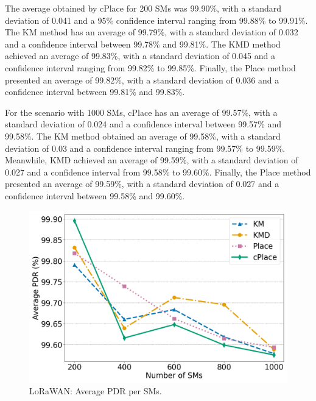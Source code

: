 \documentclass[a4paper,fleqn]{cas-dc}
\begin{document}
The average obtained by cPlace for 200 \gls{SMs} was 99.90\%, with a standard deviation of 0.041 and a 95\% confidence interval ranging from 99.88\% to 99.91\%. The KM method has an average of 99.79\%, with a standard deviation of 0.032 and a confidence interval between 99.78\% and 99.81\%. The KMD method achieved an average of 99.83\%, with a standard deviation of 0.045 and a confidence interval ranging from 99.82\% to 99.85\%. Finally, the Place method presented an average of 99.82\%, with a standard deviation of 0.036 and a confidence interval between 99.81\% and 99.83\%.

For the scenario with 1000 \gls{SMs}, cPlace has an average of 99.57\%, with a standard deviation of 0.024 and a confidence interval between 99.57\% and 99.58\%. The KM method obtained an average of 99.58\%, with a standard deviation of 0.03 and a confidence interval ranging from 99.57\% to 99.59\%. Meanwhile, KMD achieved an average of 99.59\%, with a standard deviation of 0.027 and a confidence interval from 99.58\% to 99.60\%. Finally, the Place method presented an average of 99.59\%, with a standard deviation of 0.027 and a confidence interval between 99.58\% and 99.60\%.

\begin{figure}
    \centering
    \includegraphics[width=0.98\linewidth]{imgs/pdr.png}
    \caption{LoRaWAN: Average PDR per \gls{SMs}.}
    \label{fig:pdr}
\end{figure}
\end{document}
